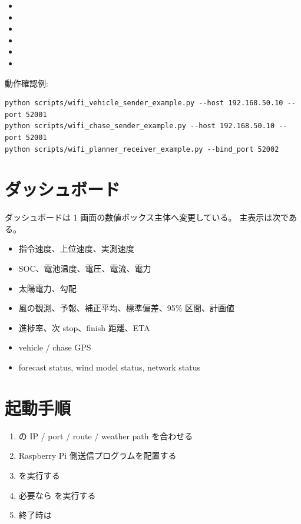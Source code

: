 \documentclass[a4paper,11pt]{article}
\begin{document}
\begin{itemize}
  \item {}
  \item {}
  \item {}
  \item {}
  \item {}
  \item {}
\end{itemize}

動作確認例:

\begin{Verbatim}[fontsize=\small]
python scripts/wifi_vehicle_sender_example.py --host 192.168.50.10 --port 52001
python scripts/wifi_chase_sender_example.py --host 192.168.50.10 --port 52001
python scripts/wifi_planner_receiver_example.py --bind_port 52002
\end{Verbatim}

\section{ダッシュボード}

ダッシュボードは 1 画面の数値ボックス主体へ変更している。
主表示は次である。

\begin{itemize}
  \item 指令速度、上位速度、実測速度
  \item SOC、電池温度、電圧、電流、電力
  \item 太陽電力、勾配
  \item 風の観測、予報、補正平均、標準偏差、95\% 区間、計画値
  \item 進捗率、次 stop、finish 距離、ETA
  \item vehicle / chase GPS
  \item forecast status, wind model status, network status
\end{itemize}

\section{起動手順}

\begin{enumerate}
  \item {} の IP / port / route / weather path を合わせる
  \item Raspberry Pi 側送信プログラムを配置する
  \item {} を実行する
  \item 必要なら  を実行する
  \item 終了時は 
\end{enumerate}
\end{document}
